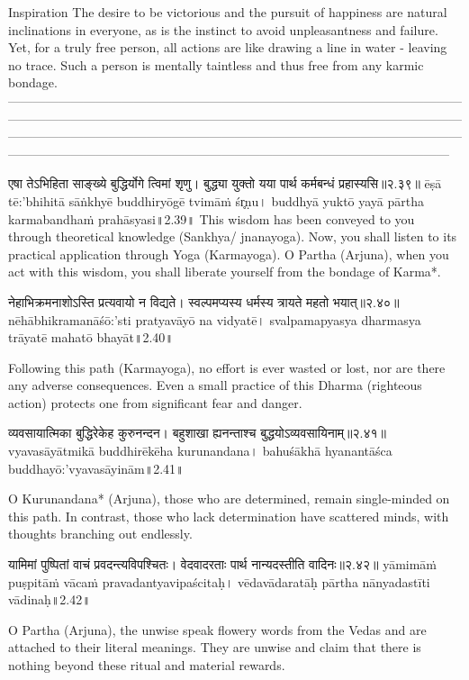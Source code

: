 Inspiration
The desire to be victorious and the pursuit of happiness are natural inclinations in everyone, as is the instinct to avoid unpleasantness and failure. Yet, for a truly free person, all actions are like drawing a line in water - leaving no trace. Such a person is mentally taintless and thus free from any karmic bondage.
—------------------------------------------------------------------------------------------------------------------------------------------------------------------------------------------------------------------------------------------------------------------------------------------------------------------------------------------------------------------------------------------------------------------------------------------



एषा तेऽभिहिता साङ्‍ख्ये बुद्धिर्योगे त्विमां शृणु।
बुद्ध्या युक्तो यया पार्थ कर्मबन्धं प्रहास्यसि॥२.३९॥
ēṣā tē:'bhihitā sāṅ‍khyē buddhiryōgē tvimāṁ śr̥ṇu।
buddhyā yuktō yayā pārtha karmabandhaṁ prahāsyasi॥2.39॥
This wisdom has been conveyed to you through theoretical knowledge (Sankhya/ jnanayoga). Now, you shall listen to its practical application through Yoga (Karmayoga). O Partha (Arjuna), when you act with this wisdom, you shall liberate yourself from the bondage of Karma*.

नेहाभिक्रमनाशोऽस्ति प्रत्यवायो न विद्यते।
 स्वल्पमप्यस्य धर्मस्य त्रायते महतो भयात्॥२.४०॥
nēhābhikramanāśō:'sti pratyavāyō na vidyatē।
svalpamapyasya dharmasya trāyatē mahatō bhayāt॥2.40॥

Following this path (Karmayoga), no effort is ever wasted or lost, nor are there any adverse consequences. Even a small practice of this Dharma (righteous action) protects one from significant fear and danger. 

व्यवसायात्मिका बुद्धिरेकेह कुरुनन्दन।
बहुशाखा ह्यनन्ताश्च बुद्धयोऽव्यवसायिनाम्॥२.४१॥
vyavasāyātmikā buddhirēkēha kurunandana।
bahuśākhā hyanantāśca buddhayō:'vyavasāyinām॥2.41॥

O Kurunandana* (Arjuna), those who are determined, remain single-minded on this path. In contrast, those who lack determination have scattered minds, with thoughts branching out endlessly. 

यामिमां पुष्पितां वाचं प्रवदन्त्यविपश्चितः।
वेदवादरताः पार्थ नान्यदस्तीति वादिनः॥२.४२॥
yāmimāṁ puṣpitāṁ vācaṁ pravadantyavipaścitaḥ।
vēdavādaratāḥ pārtha nānyadastīti vādinaḥ॥2.42॥

O Partha (Arjuna), the unwise speak flowery words from the Vedas and are attached to their literal meanings. They are unwise and claim that there is nothing beyond these ritual and material rewards.

